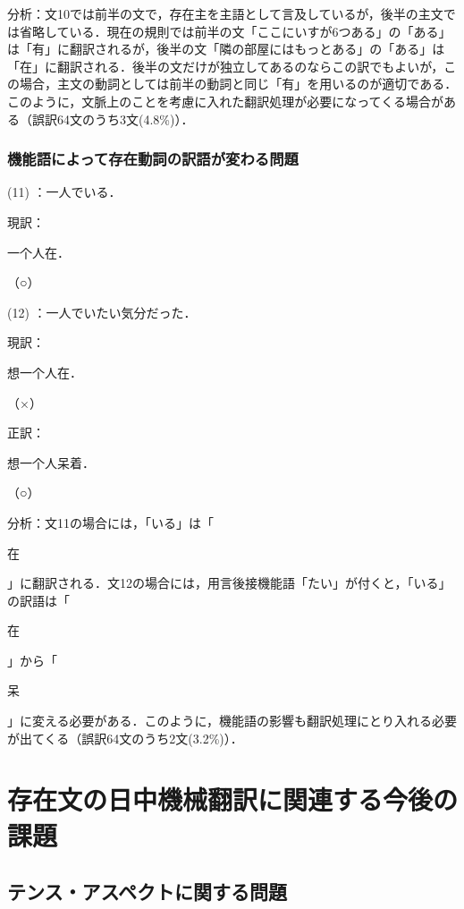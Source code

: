 \documentclass[japanese]{jnlp_1.4}
\begin{document}
分析：文10では前半の文で，存在主を主語として言及しているが，後半の主文では省略している．現在の規則では前半の文「ここにいすが6つある」の「ある」は「有」に翻訳されるが，後半の文「隣の部屋にはもっとある」の「ある」は「在」に翻訳される．後半の文だけが独立してあるのならこの訳でもよいが，この場合，主文の動詞としては前半の動詞と同じ「有」を用いるのが適切である．このように，文脈上のことを考慮に入れた翻訳処理が必要になってくる場合がある（誤訳64文のうち3文(4.8\%)）．



\subsubsection{機能語によって存在動詞の訳語が変わる問題}

(11) ：一人でいる．

現訳：\begin{簡体中文}一个人在．\end{簡体中文}（○）

(12) ：一人でいたい気分だった．

現訳：\begin{簡体中文}想一个人在．\end{簡体中文}（×）

正訳：\begin{簡体中文}想一个人呆着．\end{簡体中文}（○）

分析：文11の場合には，「いる」は「\begin{簡体中文}在\end{簡体中文}」に翻訳される．文12の場合には，用言後接機能語「たい」が付くと，「いる」の訳語は「\begin{簡体中文}在\end{簡体中文}」から「\begin{簡体中文}呆\end{簡体中文}」に変える必要がある．このように，機能語の影響も翻訳処理にとり入れる必要が出てくる（誤訳64文のうち2文(3.2\%)）．



\section{存在文の日中機械翻訳に関連する今後の課題}

\subsection{テンス・アスペクトに関する問題}
\end{document}
